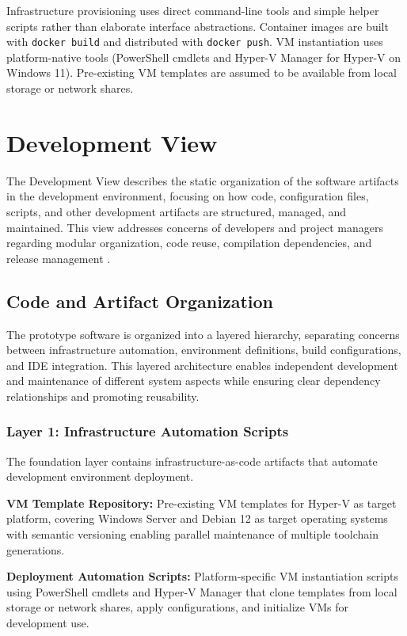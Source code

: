 Infrastructure provisioning uses direct command-line tools and simple helper scripts rather than elaborate interface abstractions.
Container images are built with \texttt{docker build} and distributed with \texttt{docker push}.
VM instantiation uses platform-native tools (PowerShell cmdlets and Hyper-V Manager for Hyper-V on Windows 11).
Pre-existing VM templates are assumed to be available from local storage or network shares.

\newpage
\section{Development View}

The Development View describes the static organization of the software artifacts in the development environment, focusing on how code, configuration files, scripts, and other development artifacts are structured, managed, and maintained.
This view addresses concerns of developers and project managers regarding modular organization, code reuse, compilation dependencies, and release management \citep{kruchten4+1ViewModel1995}.

\subsection{Code and Artifact Organization}

The prototype software is organized into a layered hierarchy, separating concerns between infrastructure automation, environment definitions, build configurations, and IDE integration.
This layered architecture enables independent development and maintenance of different system aspects while ensuring clear dependency relationships and promoting reusability.

\subsubsection{Layer 1: Infrastructure Automation Scripts}

The foundation layer contains infrastructure-as-code artifacts that automate development environment deployment.

\textbf{VM Template Repository:} Pre-existing VM templates for Hyper-V as target platform, covering Windows Server and Debian 12 as target operating systems with semantic versioning enabling parallel maintenance of multiple toolchain generations.

\textbf{Deployment Automation Scripts:} Platform-specific VM instantiation scripts using PowerShell cmdlets and Hyper-V Manager that clone templates from local storage or network shares, apply configurations, and initialize VMs for development use.

